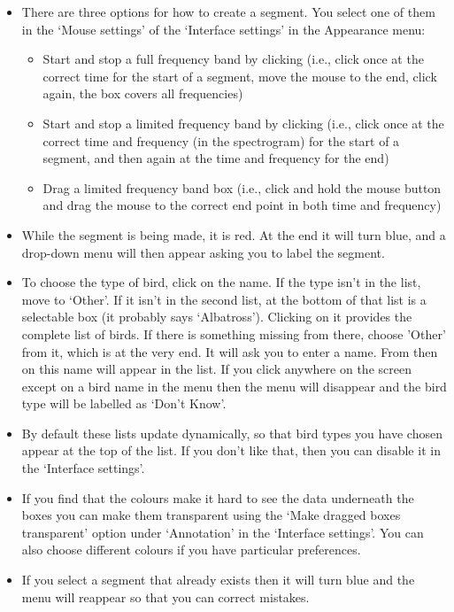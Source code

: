 \documentclass{article}
\begin{document}
\begin{itemize}
\item There are three options for how to create a segment. You select one of them in the `Mouse settings' of the `Interface settings' in the Appearance menu:
	\begin{itemize}
	\item Start and stop a full frequency band by clicking (i.e., click once at the correct time for the start of a segment, move the mouse to the end, click again, the box covers all frequencies)
	\item Start and stop a limited frequency band by clicking (i.e., click once at the correct time and frequency (in the spectrogram) for the start of a segment, and then again at the time and frequency for the end)
	\item Drag a limited frequency band box (i.e., click and hold the mouse button and drag the mouse to the correct end point in both time and frequency)
	\end{itemize}

\item While the segment is being made, it is red. At the end it will turn blue, and a drop-down menu will then appear asking you to label the segment. 

\item To choose the type of bird, click on the name. If the type isn't in the list, move to `Other'. If it isn't in the second list, at the bottom of that list is a selectable box (it probably says `Albatross'). Clicking on it provides the complete list of birds. If there is something missing from there, choose 'Other' from it, which is at the very end. It will ask you to enter a name. From then on this name will appear in the list. If you click anywhere on the screen except on a bird name in the menu then the menu will disappear and the bird type will be labelled as `Don't Know'. 

\item By default these lists update dynamically, so that bird types you have chosen appear at the top of the list. If you don't like that, then you can disable it in the `Interface settings'. 

\item If you find that the colours make it hard to see the data underneath the boxes you can make them transparent using the `Make dragged boxes transparent' option under `Annotation' in the `Interface settings'. You can also choose different colours if you have particular preferences.

\item If you select a segment that already exists then it will turn blue and the menu will reappear so that you can correct mistakes.


\end{itemize}
\end{document}
